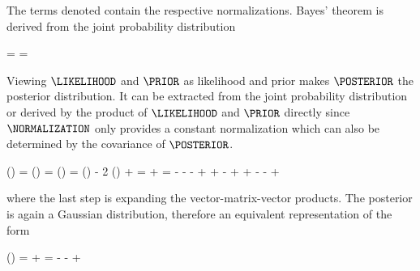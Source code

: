         The terms denoted  contain the respective normalizations.
        Bayes' theorem is derived from the joint probability distribution

        \startformula
            \JOINT = \LIKELIHOOD \PRIOR = \POSTERIOR \NORMALIZATION \EQSTOP
        \stopformula

        Viewing $\LIKELIHOOD$ and $\PRIOR$ as likelihood and prior makes
        $\POSTERIOR$ the posterior distribution. It can be extracted from
        the joint probability distribution or derived by the product of
        $\LIKELIHOOD$ and $\PRIOR$ directly since $\NORMALIZATION$ only
        provides a constant normalization which can also be determined by the
        covariance of $\POSTERIOR$.

        \placesubformula
        \startformula
        \startalign[n=2,align={right,left}]
             \ln(\POSTERIOR) =  \ln\left(\frac{\JOINT}{\NORMALIZATION}\right) \NR
            \NC =  \ln\left(\frac{\LIKELIHOOD \PRIOR}{\NORMALIZATION}\right) \NR
            \NC =  \ln(\LIKELIHOOD) - 2 \ln(\PRIOR) + \CONST \NR
            \NC = \NC \GAUSSEXP{\VECY}{\MATB \VECX - \VECB}{\MATQ}
                + \GAUSSEXP{\VECX}{\VECA}{\MATP} \NR
            \NC = \NC
                \VECYT \MATQ \VECY
                - \VECYT \MATQ \MATB \VECX
                - \VECYT \MATQ \VECB
                - \VECXT \MATBT \MATQ \VECY
                \NR
            \NC \NC
                + \VECXT \MATBT \MATQ \MATB \VECX
                + \VECXT \MATBT \MATQ \VECB
                - \VECBT \MATQ \VECY
                + \VECBT \MATQ \MATB \VECX
                \NR[eq:gaussprodexpand]
            \NC \NC
                + \VECXT \MATP \VECX
                - \VECXT \MATP \VECA
                - \VECAT \MATP \VECX
                + \CONST \EQCOMMA
                \NR
        \stopalign
        \stopformula

        where the last step is expanding the vector-matrix-vector products. The
        posterior is again a Gaussian distribution, therefore an equivalent
        representation of the form

        \placesubformula
        \startformula
        \startalign[n=2,align={right,left}]
             \ln(\POSTERIOR) = \NC
                \GAUSSEXP{\VECX}{\VECC}{\MATS} + \CONST \NR
            \NC = \NC
                 \VECXT \MATS \VECX
                 - \VECXT \MATS \VECC
                 - \VECCT \MATS \VECX
                 + \CONST \NR[eq:gausspostexpand]
        \stopalign
        \stopformula

